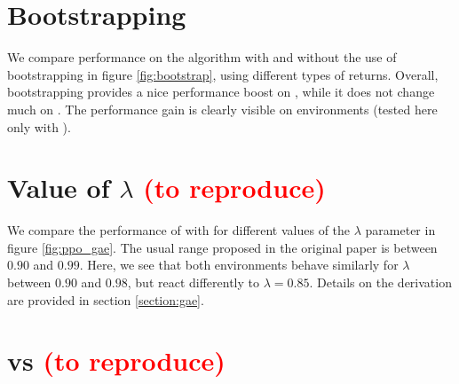 %

\section{Bootstrapping}

We compare performance on the \ppo algorithm with and without the use of bootstrapping in figure \ref{fig:bootstrap}, using different types of returns. Overall, bootstrapping provides a nice performance boost on , while it does not change much on . The performance gain is clearly visible on \mujoco environments (tested here only with \gae).



\section{Value of \gae $\lambda$ \textcolor{red}{(to reproduce)}}

We compare the performance of \ppo with \gae for different values of the $\lambda$ parameter in figure \ref{fig:ppo_gae}. The usual range proposed in the original paper \cite{gae} is between $0.90$ and $0.99$. Here, we see that both environments behave similarly for $\lambda$ between $0.90$ and $0.98$, but react differently to $\lambda = 0.85$. Details on the \gae derivation are provided in section \ref{section:gae}.



\section{\gae vs \cgae \textcolor{red}{(to reproduce)}}

